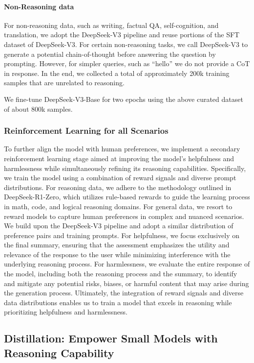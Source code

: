 \documentclass[11pt, a4paper, logo, copyright, nonumbering]{deepseek}
\newcommand{\dsro}{DeepSeek-R1-Zero}
\begin{document}
\paragraph{Non-Reasoning data}
For non-reasoning data, such as writing, factual QA, self-cognition, and translation, we adopt the DeepSeek-V3 pipeline and reuse portions of the SFT dataset of DeepSeek-V3. For certain non-reasoning tasks, we call DeepSeek-V3 to generate a potential chain-of-thought before answering the question by prompting. However, for simpler queries, such as ``hello'' we do not provide a CoT in response.
In the end, we collected a total of approximately 200k training samples that are unrelated to reasoning.


We fine-tune DeepSeek-V3-Base for two epochs using the above curated dataset of about 800k samples.


\subsubsection{Reinforcement Learning for all Scenarios}

To further align the model with human preferences, we implement a secondary reinforcement learning stage aimed at improving the model's helpfulness and harmlessness while simultaneously refining its reasoning capabilities. Specifically, we train the model using a combination of reward signals and diverse prompt distributions.
For reasoning data, we adhere to the methodology outlined in \dsro, which utilizes rule-based rewards to guide the learning process in math, code, and logical reasoning domains. 
For general data, we resort to reward models to capture human preferences in complex and nuanced scenarios. We build upon the DeepSeek-V3 pipeline and adopt a similar distribution of preference pairs and training prompts. For helpfulness, we focus exclusively on the final summary, ensuring that the assessment emphasizes the utility and relevance of the response to the user while minimizing interference with the underlying reasoning process. For harmlessness, we evaluate the entire response of the model, including both the reasoning process and the summary, to identify and mitigate any potential risks, biases, or harmful content that may arise during the generation process. 
Ultimately, the integration of reward signals and diverse data distributions enables us to train a model that excels in reasoning while prioritizing helpfulness and harmlessness.


\subsection{Distillation: Empower Small Models with Reasoning Capability }
\end{document}
